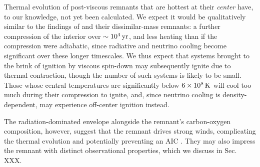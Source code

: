 
Thermal evolution of post-viscous remnants that are hottest at their \textit{center} have, to our knowledge, not yet been calculated.  We expect it would be qualitatively similar to the findings of \cite{shen+12} and \cite{schw+16} their dissimilar-mass remnants: a further compression of the interior over $\sim10^4\,\mathrm{yr}$, and less heating than if the compression were adiabatic, since radiative and neutrino cooling become significant over these longer timescales.  We thus expect that systems brought to the brink of ignition by viscous spin-down may subsequently ignite due to thermal contraction, though the number of such systems is likely to be small.  Those whose central temperatures are significantly below $6\times10^8\,\mathrm{K}$ will cool too much during their compression to ignite, and, since neutrino cooling is density-dependent, may experience off-center ignition instead.

The radiation-dominated envelope alongside the remnant's carbon-oxygen composition, however, suggest that the remnant drives strong winds, complicating the thermal evolution and potentially preventing an AIC \citep{shen+12, schw+16}.  They may also impress the remnant with distinct observational properties, which we discuss in Sec. {\charles XXX}.
